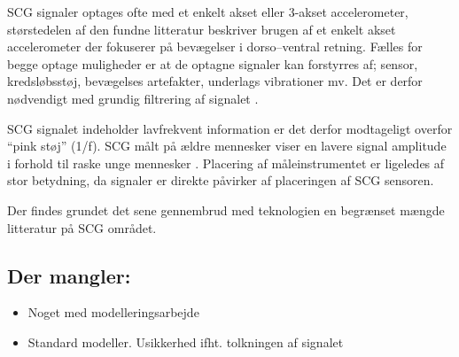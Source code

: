 SCG signaler optages ofte med et enkelt akset eller 3-akset accelerometer, størstedelen af den fundne litteratur beskriver brugen af et enkelt akset accelerometer der fokuserer på bevægelser i dorso–ventral retning. Fælles for begge optage muligheder er at de optagne signaler kan forstyrres af; sensor, kredsløbsstøj, bevægelses artefakter, underlags vibrationer mv. Det er derfor nødvendigt med grundig filtrering af signalet \cite{Recent_Advances}.


SCG signalet indeholder lavfrekvent information er det derfor modtageligt overfor “pink støj” (1/f). SCG målt på ældre mennesker viser en lavere signal amplitude i forhold til raske unge mennesker \cite{Recent_Advances}. Placering af måleinstrumentet er ligeledes af stor betydning, da signaler er direkte påvirker af placeringen af SCG sensoren.


Der findes grundet det sene gennembrud med teknologien en begrænset mængde litteratur på SCG området.

\subsection{Der mangler:} 
\begin{itemize}
	\item Noget med modelleringsarbejde
	\item Standard modeller. Usikkerhed ifht. tolkningen af signalet
\end{itemize}